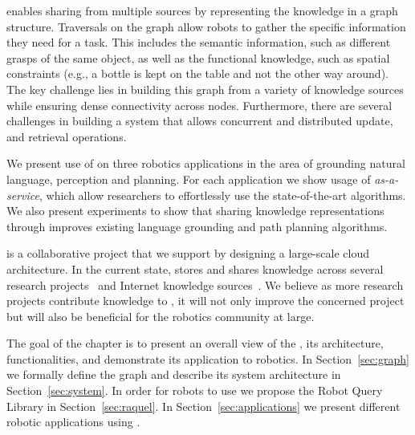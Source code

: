 \robobrain{} enables sharing from multiple sources by representing the knowledge in a graph structure.
Traversals on the \robobrain{} graph allow robots to gather the specific information they need for a task. This includes the  semantic information, such as different grasps of the same object, as well as the functional knowledge, such as spatial constraints (e.g., a bottle is kept on the table and not the other way around).
The key challenge lies in building this graph from a variety of knowledge sources while ensuring dense connectivity across nodes. Furthermore, there are several  challenges in building a system that allows concurrent and distributed update, and retrieval operations.

We  present use of \robobrain{} on three robotics applications in the area of grounding natural language, perception and planning.
For each application we show usage of \robobrain{} \textit{as-a-service}, which allow researchers to effortlessly use the state-of-the-art algorithms. We also present experiments to show that sharing knowledge representations through \robobrain{} improves existing language grounding and path planning algorithms.


\robobrain{} is a collaborative project that we support by designing a large-scale cloud architecture.
In the current state, \robobrain{} stores and shares knowledge across several research projects~\cite{tellex2011understanding,misra2014tell,jainsaxena2013_trajectorypreferences,jiang-hallucinatinghumans-labeling3dscenes-cvpr2013,jiang2012humancontext,KoppulaRSS2013,wulenzsaxena2014_hierarchicalrgbdlabeling,lenz2013_deeplearning_roboticgrasp} and Internet knowledge sources~\citep{cyc1995,wordnet1998}.
We believe as more research projects contribute knowledge to \robobrain{}, it will not only improve the concerned project but will
also be beneficial for the robotics community at large.

The goal of the chapter is to present an overall view of the \robobrain{}, its architecture, functionalities, and demonstrate its application to robotics. In Section~\ref{sec:graph} we formally define the \robobrain{} graph and describe its
system architecture in Section~\ref{sec:system}. In order for robots to use
\robobrain{} we propose the Robot Query Library in Section~\ref{sec:raquel}. In
Section~\ref{sec:applications} we present different robotic applications using \robobrain{}.
